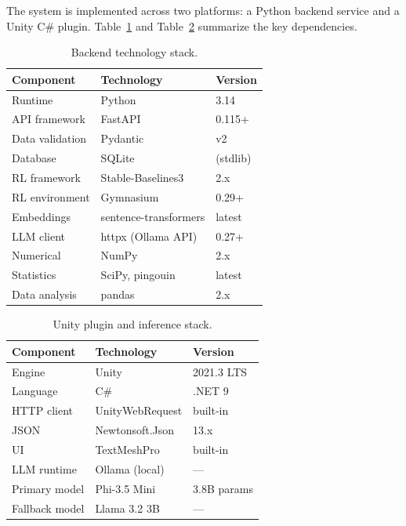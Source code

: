 The system is implemented across two platforms: a Python backend service and a Unity C\# plugin. Table~\ref{tab:backend_stack} and Table~\ref{tab:unity_stack} summarize the key dependencies.

\begin{table}[H]
\centering
\caption{Backend technology stack.}
\label{tab:backend_stack}
\small
\begin{tabular}{@{}lll@{}}
\toprule
\textbf{Component} & \textbf{Technology} & \textbf{Version} \\
\midrule
Runtime & Python & 3.14 \\
API framework & FastAPI & 0.115+ \\
Data validation & Pydantic & v2 \\
Database & SQLite & (stdlib) \\
RL framework & Stable-Baselines3 & 2.x \\
RL environment & Gymnasium & 0.29+ \\
Embeddings & sentence-transformers & latest \\
LLM client & httpx (Ollama API) & 0.27+ \\
Numerical & NumPy & 2.x \\
Statistics & SciPy, pingouin & latest \\
Data analysis & pandas & 2.x \\
\bottomrule
\end{tabular}
\end{table}

\begin{table}[H]
\centering
\caption{Unity plugin and inference stack.}
\label{tab:unity_stack}
\small
\begin{tabular}{@{}lll@{}}
\toprule
\textbf{Component} & \textbf{Technology} & \textbf{Version} \\
\midrule
Engine & Unity & 2021.3 LTS \\
Language & C\# & .NET 9 \\
HTTP client & UnityWebRequest & built-in \\
JSON & Newtonsoft.Json & 13.x \\
UI & TextMeshPro & built-in \\
\midrule
LLM runtime & Ollama (local) & --- \\
Primary model & Phi-3.5 Mini & 3.8B params \\
Fallback model & Llama 3.2 3B & --- \\
\bottomrule
\end{tabular}
\end{table}

